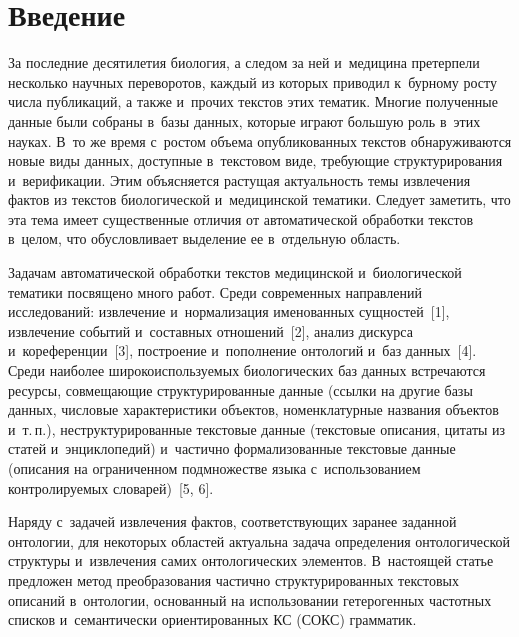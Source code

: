 \begin{multicols}{2}

\label{st\stat}
  
  \section{Введение}
  
  
  За последние десятилетия биология, а следом за ней и~медицина претерпели 
несколько научных переворотов, каждый из которых приводил к~бурному росту 
числа публикаций, а также и~прочих текстов этих тематик. Многие полученные 
данные были собраны в~базы данных, которые играют большую роль в~этих 
науках. В~то же время с~ростом объема опубликованных текстов 
обнаруживаются новые виды данных, доступные в~текстовом виде, требующие 
структурирования и~верификации. Этим объясняется растущая актуальность 
темы извлечения фактов из текстов биологической и~медицинской тематики. 
Следует заметить, что эта тема имеет существенные отличия от автоматической 
обработки текстов в~целом, что обусловливает выделение ее в~отдельную 
область.
  
  Задачам автоматической обработки текстов медицинской и~биологической 
тематики посвящено много работ. Среди современных направлений 
исследова\-ний: извлечение и~нормализация именованных сущностей~[1], 
извлечение событий и~состав\-ных отношений~[2], анализ дискурса 
и~ко\-референции~[3], построение и~пополнение онтологий и~баз данных~[4]. 
Среди наиболее широко\linebreak используемых биологических баз данных встречаются 
ресурсы, совмещающие структурированные данные (ссылки на другие базы 
данных, чис\-ло\-вые характеристики объектов, номенклатурные на\-звания 
объектов и~т.\,п.), неструктурированные тексто\-вые данные (текстовые 
описания, цитаты из статей и~эн\-цик\-ло\-пе\-дий) и~час\-тич\-но формализованные 
текстовые данные (описания на ограниченном подмножестве языка 
с~использованием контролируемых словарей)~[5, 6].
  
  Наряду с~задачей извлечения фактов, соответ\-ст\-вующих заранее заданной 
онтологии, для неко\-торых областей актуальна задача определения 
онтологической структуры и~извлечения самих онтологиче\-ских элементов. 
%
В~настоящей статье {пред\-ло\-жен} метод преобразования частично 
структурированных текстовых описаний в~онтологии, основанный на 
использовании гетерогенных час\-тот\-ных списков и~семантически 
ориентированных КС (СОКС) грамматик.
  

\end{multicols}
